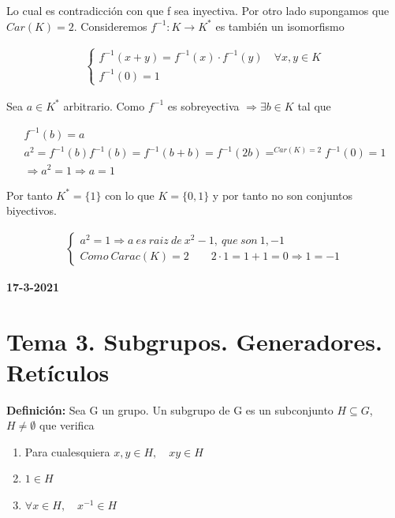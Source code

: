 \documentclass{article}
\begin{document}
Lo cual es contradicción con que f sea inyectiva. Por otro lado supongamos que $Car(K)=2$. Consideremos $f^{-1}:K\rightarrow K^*$ es también un isomorfismo

\begin{gather*}
\left\lbrace \begin{array}{c}
f^{-1}(x+y)=f^{-1}(x)\cdot f^{-1}(y) \quad \forall x,y \in K \\
f^{-1}(0)=1
\end{array} \right.
\end{gather*}

Sea $a\in K^*$ arbitrario. Como $f^{-1}$ es sobreyectiva $\Rightarrow \exists b \in K$ tal que

\begin{gather*}
f^{-1}(b)=a \\
a^2=f^{-1}(b)f^{-1}(b)=f^{-1}(b+b)= f^{-1}(2b)=^{Car(K)=2}f^{-1}(0)=1 \\
\Rightarrow a^2=1 \Rightarrow a=1
\end{gather*}

Por tanto $K^*=\{1\}$ con lo que $K=\{0,1\}$ y por tanto no son conjuntos biyectivos.

\begin{gather*}
\left\lbrace \begin{array}{c}
a^2=1 \Rightarrow a\>es\>raiz\>de\> x^2-1,\> que\> son\> 1,-1 \\
Como\> Carac(K)=2 \qquad 2\cdot 1=1+1=0 \Rightarrow 1=-1
\end{array} \right.
\end{gather*}

\textbf{17-3-2021} \\

\section{Tema 3. Subgrupos. Generadores. Retículos}

\textbf{Definición:} Sea G un grupo. Un subgrupo de G es un subconjunto $H\subseteq G$, $H \neq \emptyset$ que verifica

\begin{enumerate}[(1)]
\item Para cualesquiera $x,y\in H, \quad xy\in H$

\item $1 \in H$

\item $\forall x  \in H,\quad x^{-1}\in H$
\end{enumerate}
\end{document}
